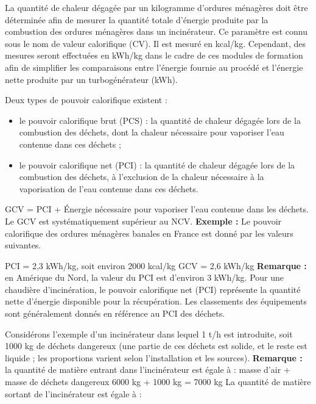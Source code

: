 La quantité de chaleur dégagée par un kilogramme d'ordures ménagères doit être déterminée afin de mesurer la quantité totale d'énergie produite par la combustion des ordures ménagères dans un incinérateur. Ce paramètre est connu sous le nom de valeur calorifique (CV). Il est mesuré en kcal/kg. Cependant, des mesures seront effectuées en kWh/kg dans le cadre de ces modules de formation afin de simplifier les comparaisons entre l'énergie fournie au procédé et l'énergie nette produite par un turbogénérateur (kWh).

Deux types de pouvoir calorifique existent :
\begin{itemize}
    \item le pouvoir calorifique brut (PCS) : la quantité de chaleur dégagée lors de la combustion des déchets, dont la chaleur nécessaire pour vaporiser l'eau contenue dans ces déchets ;
    \item le pouvoir calorifique net (PCI) : la quantité de chaleur dégagée lors de la combustion des déchets, à l'exclusion de la chaleur nécessaire à la vaporisation de l'eau contenue dans ces déchets.
\end{itemize}

GCV = PCI + Énergie nécessaire pour vaporiser l'eau contenue dans les déchets.
Le GCV est systématiquement supérieur au NCV.
\vspace{0.3cm}
\textbf{Exemple : }
\vspace{0.3cm}
Le pouvoir calorifique des ordures ménagères banales en France est donné par les valeurs suivantes.

PCI = 2,3 kWh/kg, soit environ 2000 kcal/kg
GCV = 2,6 kWh/kg
\vspace{0.3cm}
\textbf{Remarque : }en Amérique du Nord, la valeur du PCI est d'environ 3 kWh/kg.
\vspace{0.3cm}
Pour une chaudière d'incinération, le pouvoir calorifique net (PCI) représente la quantité nette d'énergie disponible pour la récupération. Les classements des équipements sont généralement donnés en référence au PCI des déchets.

\vspace{0.3cm}


Considérons l'exemple d'un incinérateur dans lequel 1 t/h est introduite, soit 1000 kg de déchets dangereux (une partie de ces déchets est solide, et le reste est liquide ; les proportions varient selon l'installation et les sources).
\vspace{0.3cm}
\textbf{Remarque :} la quantité de matière entrant dans l'incinérateur est égale à : 
\vspace{0.3cm}
masse d'air + masse de déchets dangereux
6000 kg + 1000 kg = 7000 kg
\vspace{0.3cm}
La quantité de matière sortant de l'incinérateur est égale à :

